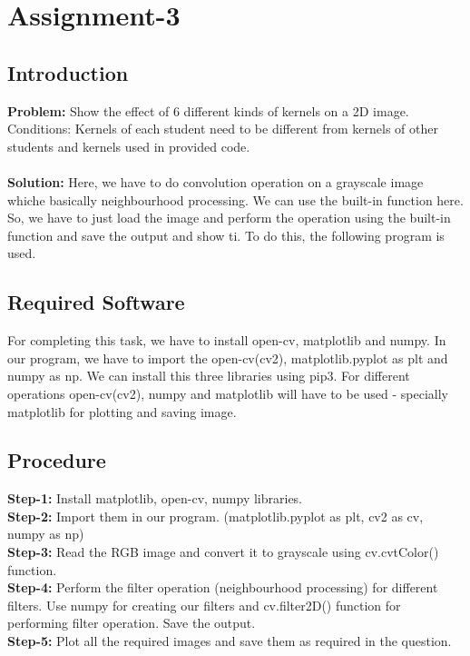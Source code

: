 \documentclass{article}
\begin{document}
{
    \section{Assignment-3}
    \subsection{Introduction}
    \textbf {Problem: }
    Show the effect of 6 different kinds of kernels on a 2D image.
    Conditions:
    Kernels of each student  need to be  different from kernels of other students and kernels used in provided code.\\
    \\
    \textbf{Solution: }
    Here, we have to do convolution operation on a grayscale image whiche basically neighbourhood processing. We can use the built-in function here. So, we have to just load the image and perform the operation using the built-in function and save the output and show ti. To do this, the following program is used.
    \\
    
    \subsection{Required Software}
    For completing this task, we have to install open-cv, matplotlib and numpy. In our program, we have to import the open-cv(cv2), matplotlib.pyplot as plt and numpy as np. We can install this three libraries using pip3. For different operations open-cv(cv2), numpy and matplotlib will have to be used - specially matplotlib for plotting and saving image. 
    \\
    
    \subsection{Procedure}
    \textbf{Step-1:}
    Install matplotlib, open-cv, numpy libraries.\\
    \textbf{Step-2:}
    Import them in our program. (matplotlib.pyplot as plt, cv2 as cv, numpy as np)\\
    \textbf{Step-3:}
    Read the RGB image and convert it to grayscale using cv.cvtColor() function.\\
    \textbf{Step-4:}
    Perform the filter operation (neighbourhood processing) for different filters. Use numpy for creating our filters and cv.filter2D() function for performing filter operation. Save the output.\\
    \textbf{Step-5:}
    Plot all the required images and save them as required in the question.\\
    
}
\end{document}
